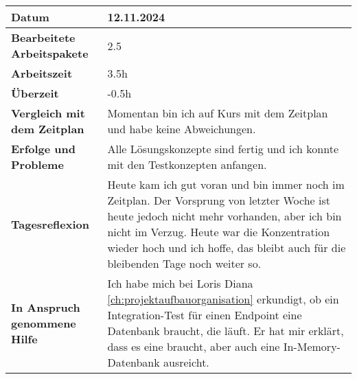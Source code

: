 \begin{longtable}{p{}|p{}}
	\hline
	\textbf{Datum}                       & 12.11.2024            \\
	\hline
	\textbf{Bearbeitete Arbeitspakete}   & 2.5                  \\
	\hline
	\textbf{Arbeitszeit}                 & 3.5h                                    \\
	\hline
	\textbf{Überzeit}                    & -0.5h                                    \\
	\hline
	\textbf{Vergleich mit dem Zeitplan}  & Momentan bin ich auf Kurs mit dem Zeitplan und habe keine Abweichungen. \\
	\hline
	\textbf{Erfolge und Probleme} & Alle Lösungskonzepte sind fertig und ich konnte mit den Testkonzepten anfangen.
	\\
	\hline
	\textbf{Tagesreflexion} & Heute kam ich gut voran und bin immer noch im Zeitplan. Der Vorsprung von letzter Woche ist heute jedoch nicht mehr vorhanden, aber ich bin nicht im Verzug. Heute war die Konzentration wieder hoch und ich hoffe, das bleibt auch für die bleibenden Tage noch weiter so.
	\\
	\hline
	\textbf{In Anspruch genommene Hilfe} & Ich habe mich bei Loris Diana \ref{ch:projektaufbauorganisation} erkundigt, ob ein Integration-Test für einen Endpoint eine Datenbank braucht, die läuft. Er hat mir erklärt, dass es eine braucht, aber auch eine In-Memory-Datenbank ausreicht.                              \\
	\hline
\end{longtable}\label{tab:arbeitsprotokoll-12.11.2024}
\newpage

